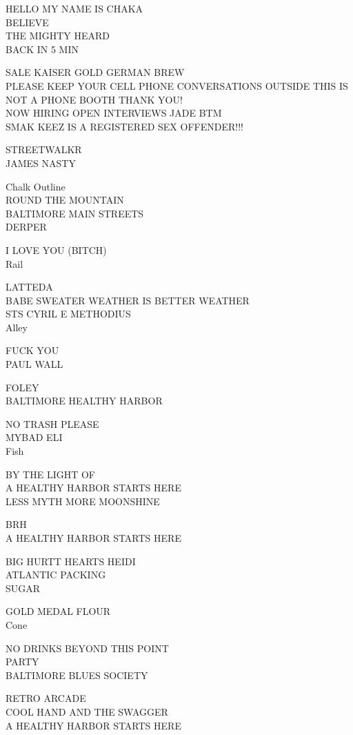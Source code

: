 \documentclass[10pt,letterpaper]{article}
\begin{document}
HELLO MY NAME IS CHAKA\\
BELIEVE\\
THE MIGHTY HEARD\\
BACK IN 5 MIN

SALE KAISER GOLD GERMAN BREW\\
PLEASE KEEP YOUR CELL PHONE CONVERSATIONS OUTSIDE THIS IS NOT A PHONE BOOTH THANK YOU!\\
NOW HIRING OPEN INTERVIEWS JADE BTM\\
SMAK KEEZ IS A REGISTERED SEX OFFENDER!!!

STREETWALKR\\
JAMES NASTY

Chalk Outline\\
ROUND THE MOUNTAIN\\
BALTIMORE MAIN STREETS\\
DERPER

I LOVE YOU (BITCH)\\
Rail

LATTEDA\\
BABE SWEATER WEATHER IS BETTER WEATHER\\
STS CYRIL E METHODIUS\\
Alley

FUCK YOU\\
PAUL WALL

FOLEY\\
BALTIMORE HEALTHY HARBOR

NO TRASH PLEASE\\
MYBAD ELI\\
Fish

BY THE LIGHT OF\\
A HEALTHY HARBOR STARTS HERE\\
LESS MYTH MORE MOONSHINE

BRH\\
A HEALTHY HARBOR STARTS HERE

BIG HURTT HEARTS HEIDI\\
ATLANTIC PACKING\\
SUGAR

GOLD MEDAL FLOUR\\
Cone

NO DRINKS BEYOND THIS POINT\\
PARTY\\
BALTIMORE BLUES SOCIETY

RETRO ARCADE\\
COOL HAND AND THE SWAGGER\\
A HEALTHY HARBOR STARTS HERE
\end{document}
